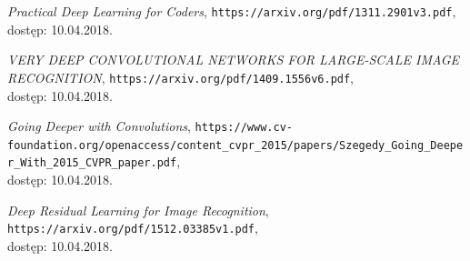 \documentclass[a4paper,twoside,titlepage,openright]{book}
\begin{document}
\begin{thebibliography}{99}
 \textit{Practical Deep Learning for Coders}, 
\texttt{https://arxiv.org/pdf/1311.2901v3.pdf}, \\dostęp: 10.04.2018.

 \textit{VERY DEEP CONVOLUTIONAL NETWORKS FOR LARGE-SCALE IMAGE RECOGNITION}, 
\texttt{https://arxiv.org/pdf/1409.1556v6.pdf}, \\dostęp: 10.04.2018.

 \textit{Going Deeper with Convolutions}, 
\texttt{https://www.cv-foundation.org/openaccess/content\_cvpr\_2015/papers/Szegedy\_Going\_Deeper\_With\_2015\_CVPR\_paper.pdf}, \\dostęp: 10.04.2018.

 \textit{Deep Residual Learning for Image Recognition}, 
\texttt{https://arxiv.org/pdf/1512.03385v1.pdf}, \\dostęp: 10.04.2018.

\end{thebibliography}
\end{document}
